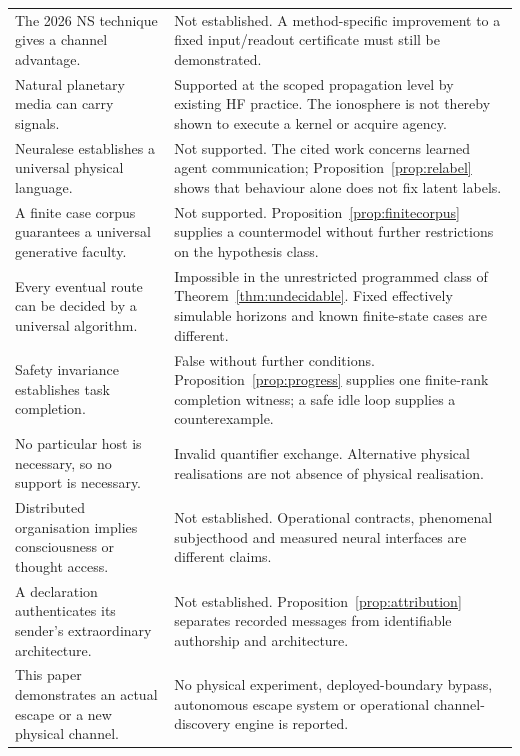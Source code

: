 \documentclass[11pt,a4paper]{article}
\theoremstyle{definition}
\theoremstyle{remark}
\begin{document}
\begin{longtable}{@{}>{\raggedright\arraybackslash}p{}>{\raggedright\arraybackslash}p{}@{}}
The 2026 NS technique gives a channel advantage. & Not established. A method-specific improvement to a fixed input/readout certificate must still be demonstrated. \\\addlinespace
Natural planetary media can carry signals. & Supported at the scoped propagation level by existing HF practice. The ionosphere is not thereby shown to execute a kernel or acquire agency. \\\addlinespace
Neuralese establishes a universal physical language. & Not supported. The cited work concerns learned agent communication; Proposition~\ref{prop:relabel} shows that behaviour alone does not fix latent labels. \\\addlinespace
A finite case corpus guarantees a universal generative faculty. & Not supported. Proposition~\ref{prop:finitecorpus} supplies a countermodel without further restrictions on the hypothesis class. \\\addlinespace
Every eventual route can be decided by a universal algorithm. & Impossible in the unrestricted programmed class of Theorem~\ref{thm:undecidable}. Fixed effectively simulable horizons and known finite-state cases are different. \\\addlinespace
Safety invariance establishes task completion. & False without further conditions. Proposition~\ref{prop:progress} supplies one finite-rank completion witness; a safe idle loop supplies a counterexample. \\\addlinespace
No particular host is necessary, so no support is necessary. & Invalid quantifier exchange. Alternative physical realisations are not absence of physical realisation. \\\addlinespace
Distributed organisation implies consciousness or thought access. & Not established. Operational contracts, phenomenal subjecthood and measured neural interfaces are different claims. \\\addlinespace
A declaration authenticates its sender's extraordinary architecture. & Not established. Proposition~\ref{prop:attribution} separates recorded messages from identifiable authorship and architecture. \\\addlinespace
This paper demonstrates an actual escape or a new physical channel. & No physical experiment, deployed-boundary bypass, autonomous escape system or operational channel-discovery engine is reported. \\
\bottomrule
\end{longtable}
\endgroup
\end{document}
